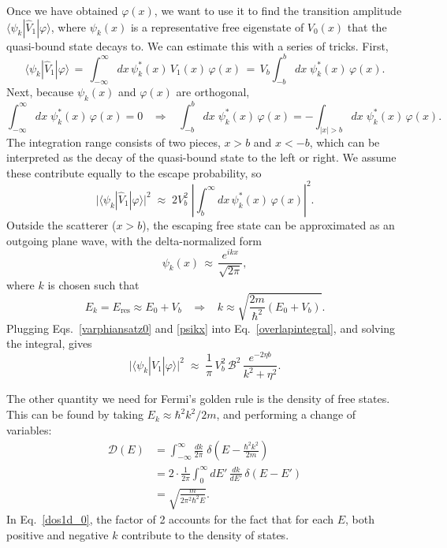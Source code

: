 \documentclass[pra,12pt]{revtex4}
\begin{document}
Once we have obtained $\varphi(x)$, we want to use it to find the
transition amplitude $\langle\psi_k|\hat{V}_1|\varphi\rangle$, where
$\psi_k(x)$ is a representative free eigenstate of $V_0(x)$ that the
quasi-bound state decays to.  We can estimate this with a series of
tricks.  First,
\begin{equation}
  \langle\psi_k|\hat{V}_1|\varphi\rangle \,=\, \int_{-\infty}^\infty dx \, \psi_k^*(x)\, V_1(x)\, \varphi(x) \,=\, V_b \int_{-b}^b dx \; \psi_k^*(x) \,\varphi(x).
\end{equation}
Next, because $\psi_k(x)$ and $\varphi(x)$ are orthogonal,
\begin{equation}
  \int_{-\infty}^\infty dx \; \psi_k^*(x) \,\varphi(x) = 0
  \;\;\;\Rightarrow \;\;\;  
  \int_{-b}^b dx \; \psi_k^*(x) \,\varphi(x) = - \int_{|x| > b} dx \; \psi_k^*(x) \,\varphi(x).
\end{equation}
The integration range consists of two pieces, $x > b$ and $x < -b$,
which can be interpreted as the decay of the quasi-bound state to the
left or right.  We assume these contribute equally to the escape
probability, so
\begin{equation}
  \big| \langle\psi_k|\hat{V}_1|\varphi\rangle \big|^2
  \;\approx\; 2 V_b^2 \;
  \left| \int_{b}^\infty dx \, \psi_k^*(x)\, \varphi(x)\right|^2.
  \label{overlapintegral}
\end{equation}
Outside the scatterer ($x > b$), the escaping free state can be
approximated as an outgoing plane wave, with the delta-normalized form
\begin{equation}
  \psi_k(x) \,\approx\, \frac{e^{ikx}}{\sqrt{2\pi}},
  \label{psikx}
\end{equation}
where $k$ is chosen such that
\begin{equation}
  E_k = E_{\mathrm{res}} \approx E_0 + V_b \;\;\;\Rightarrow \;\;\; k \approx \sqrt{\frac{2m}{\hbar^2}(E_0+V_b)}.
\end{equation}
Plugging Eqs.~\eqref{varphiansatz0} and \eqref{psikx} into
Eq.~\eqref{overlapintegral}, and solving the integral, gives
\begin{equation}
  \big| \langle\psi_k|\hat{V}_1|\varphi\rangle \big|^2
  \;\approx \; \frac{1}{\pi}\, V_b^2 \, \mathcal{B}^2\,
  \frac{e^{-2\eta b}}{k^2 + \eta^2}.
  \label{overlap1d}
\end{equation}

The other quantity we need for Fermi's golden rule is the density of
free states.  This can be found by taking $E_k \approx \hbar^2k^2/2m$,
and performing a change of variables:
\begin{align}
  \mathcal{D}(E)
  &= \int_{-\infty}^\infty \frac{dk}{2\pi} \; \delta\left(E-\frac{\hbar^2k^2}{2m}\right) \\
  &= 2 \cdot \frac{1}{2\pi} \int_0^\infty dE' \, \frac{dk}{dE'} \, \delta(E-E') \label{dos1d_0} \\
  &= \sqrt{\frac{m}{2\pi^2\hbar^2 E}}.
  \label{dos1d}
\end{align}
In Eq.~\eqref{dos1d_0}, the factor of 2 accounts for the fact that for
each $E$, both positive and negative $k$ contribute to the density of
states.
\end{document}
